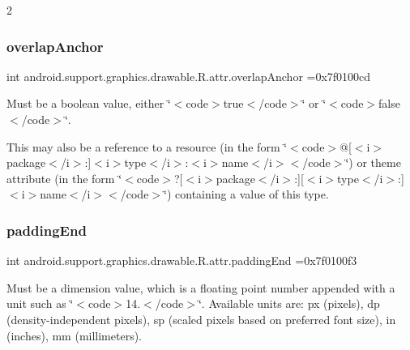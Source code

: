2\mbox{\label{classandroid_1_1support_1_1graphics_1_1drawable_1_1R_1_1attr_a05fa6ec119aabfd3b7f59b773ac6469f}} 
\subsubsection{\texorpdfstring{overlap\+Anchor}{overlapAnchor}}
{\footnotesize\ttfamily int android.\+support.\+graphics.\+drawable.\+R.\+attr.\+overlap\+Anchor =0x7f0100cd\hspace{0.3cm}{\ttfamily [static]}}

Must be a boolean value, either \char`\"{}$<$code$>$true$<$/code$>$\char`\"{} or \char`\"{}$<$code$>$false$<$/code$>$\char`\"{}. 

This may also be a reference to a resource (in the form \char`\"{}$<$code$>$@\mbox{[}$<$i$>$package$<$/i$>$\+:\mbox{]}$<$i$>$type$<$/i$>$\+:$<$i$>$name$<$/i$>$$<$/code$>$\char`\"{}) or theme attribute (in the form \char`\"{}$<$code$>$?\mbox{[}$<$i$>$package$<$/i$>$\+:\mbox{]}\mbox{[}$<$i$>$type$<$/i$>$\+:\mbox{]}$<$i$>$name$<$/i$>$$<$/code$>$\char`\"{}) containing a value of this type. \mbox{\label{classandroid_1_1support_1_1graphics_1_1drawable_1_1R_1_1attr_a313bf7dcc9f32fa7eb7517f1bc79bb49}} 
\subsubsection{\texorpdfstring{padding\+End}{paddingEnd}}
{\footnotesize\ttfamily int android.\+support.\+graphics.\+drawable.\+R.\+attr.\+padding\+End =0x7f0100f3\hspace{0.3cm}{\ttfamily [static]}}

Must be a dimension value, which is a floating point number appended with a unit such as \char`\"{}$<$code$>$14.\+5sp$<$/code$>$\char`\"{}. Available units are\+: px (pixels), dp (density-\/independent pixels), sp (scaled pixels based on preferred font size), in (inches), mm (millimeters). 

